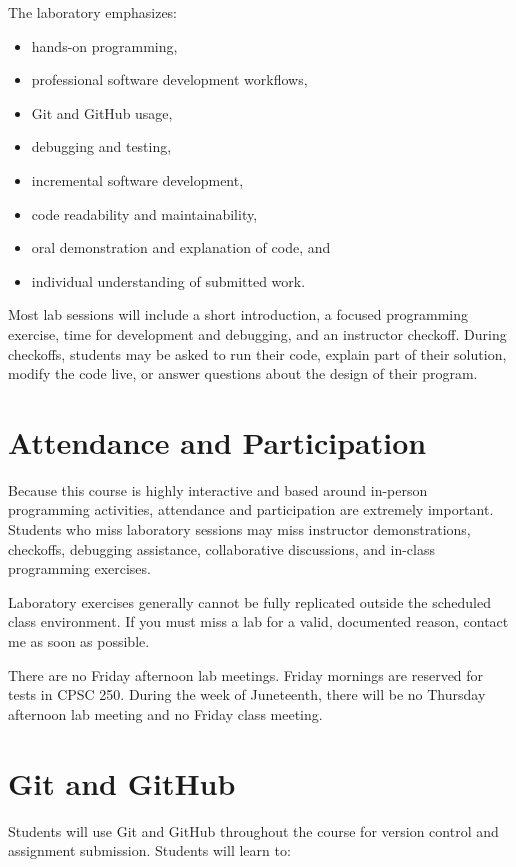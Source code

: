 \documentclass[11pt]{article}
\begin{document}
The laboratory emphasizes:

\begin{itemize}[itemsep=0.2em]
    \item hands-on programming,
    \item professional software development workflows,
    \item Git and GitHub usage,
    \item debugging and testing,
    \item incremental software development,
    \item code readability and maintainability,
    \item oral demonstration and explanation of code, and
    \item individual understanding of submitted work.
\end{itemize}

Most lab sessions will include a short introduction, a focused programming exercise, time for development and debugging, and an instructor checkoff. During checkoffs, students may be asked to run their code, explain part of their solution, modify the code live, or answer questions about the design of their program.

\section{Attendance and Participation}

Because this course is highly interactive and based around in-person programming activities, attendance and participation are extremely important. Students who miss laboratory sessions may miss instructor demonstrations, checkoffs, debugging assistance, collaborative discussions, and in-class programming exercises.

Laboratory exercises generally cannot be fully replicated outside the scheduled class environment. If you must miss a lab for a valid, documented reason, contact me as soon as possible.

There are no Friday afternoon lab meetings. Friday mornings are reserved for tests in CPSC 250. During the week of Juneteenth, there will be no Thursday afternoon lab meeting and no Friday class meeting.

\section{Git and GitHub}

Students will use Git and GitHub throughout the course for version control and assignment submission. Students will learn to:
\end{document}
